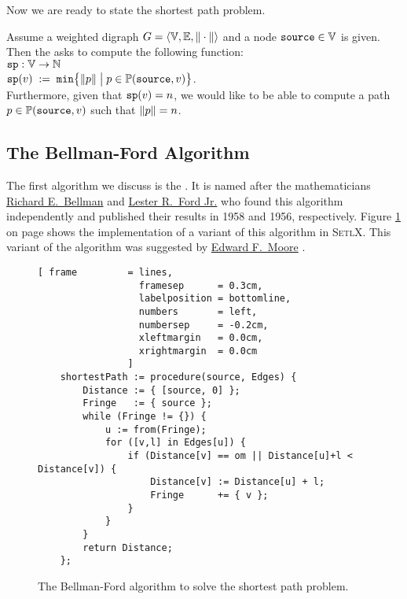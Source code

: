 \noindent
Now we are ready to state the shortest path problem.

\begin{Definition} \lb
  Assume a weighted digraph  
  $G = \langle {\mathbb V}, {\mathbb E}, \|\cdot\| \rangle$ 
  and a node $\mbox{\tt source} \in {\mathbb V}$ is given.  Then the  asks to compute
  the following function:
  \\[0.2cm]
  \hspace*{1.3cm} $\mathtt{sp}: {\mathbb V} \rightarrow {\mathbb N}$ \\[0.1cm]
  \hspace*{1.3cm} $\mathtt{sp}(v) \;:=\; \texttt{min}\bigl\{ \|p\| \bigm| p \in {\mathbb P}(\mbox{\tt source},v) \bigr\}$.
  \\[0.2cm]
  Furthermore, given that $\mathtt{sp}(v) = n$, we would like to be able to compute a path 
  $p \in {\mathbb P}(\mbox{\tt source},v)$ such that $\|p\| = n$.
  \eox
\end{Definition}

\subsection{The Bellman-Ford Algorithm}
The first algorithm we discuss is the
\href{https://en.wikipedia.org/wiki/Bellman-Ford_algorithm}{}.
It is named after the mathematicians 
\href{https://en.wikipedia.org/wiki/Richard_E._Bellman}{Richard E.~Bellman} \cite{bellman:58} and 
\href{https://en.wikipedia.org/wiki/L._R._Ford_Jr.}{Lester R.~Ford Jr.} \cite{ford:56} who found this algorithm
independently and published their results in 1958 and 1956, respectively.  Figure
\ref{fig:moore.stlx} on page \pageref{fig:moore.stlx} shows the implementation of a variant of this 
algorithm in \textsc{SetlX}.  This variant of the algorithm was suggested by 
\href{https://en.wikipedia.org/wiki/Edward_F._Moore}{Edward F.~Moore} \cite{moore:59}.


\begin{figure}[!ht]
  \centering
\begin{Verbatim}[ frame         = lines, 
                  framesep      = 0.3cm, 
                  labelposition = bottomline,
                  numbers       = left,
                  numbersep     = -0.2cm,
                  xleftmargin   = 0.0cm,
                  xrightmargin  = 0.0cm
                ]
    shortestPath := procedure(source, Edges) {
        Distance := { [source, 0] };
        Fringe   := { source };
        while (Fringe != {}) {
            u := from(Fringe);
            for ([v,l] in Edges[u]) {
                if (Distance[v] == om || Distance[u]+l < Distance[v]) {
                    Distance[v] := Distance[u] + l;
                    Fringe      += { v };
                }
            }
        }
        return Distance;
    };
\end{Verbatim}
\vspace*{-0.3cm}
  \caption{The Bellman-Ford algorithm to solve the shortest path problem.}
  \label{fig:moore.stlx}
\end{figure} 

